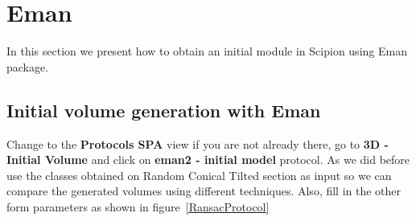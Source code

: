 \documentclass[12pt]{article} %
\begin{document}
\section{Eman}
In this section we present how to obtain an initial module in Scipion using Eman package.

\subsection{Initial volume generation with Eman}
Change to the \textbf{Protocols SPA} view if you are not already there, go to \textbf{3D - Initial Volume} and click on \textbf{eman2 - initial model} protocol. 
As we did before use the classes obtained on Random Conical Tilted section as input so we can compare the generated volumes using different 
techniques. Also, fill in the other form parameters as shown in figure~\ref{RansacProtocol}



\end{document}
